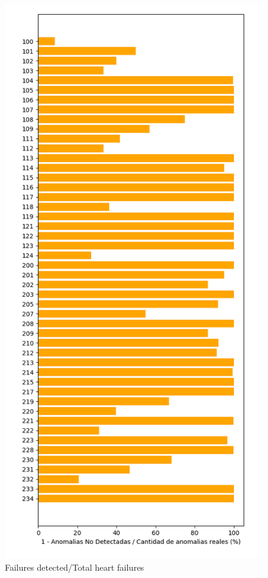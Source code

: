 \documentclass[conference]{IEEEtran}
\begin{document}
\begin{figure}[H]
\centerline{\includegraphics[scale=0.3]{imagenes/EfectividadExistentes}}
\caption{Failures detected/Total heart failures}
\label{fig}
\end{figure}
\end{document}

